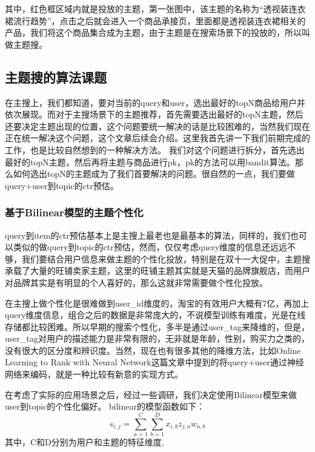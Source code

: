 其中，红色框区域内就是投放的主题，第一张图中，该主题的名称为“透视装连衣裙流行趋势”，点击之后就会进入一个商品承接页，里面都是透视装连衣裙相关的产品，我们将这个商品集合成为主题，由于主题是在搜索场景下的投放的，所以叫做主题搜。
\subsection{主题搜的算法课题}
在主搜上，我们都知道，要对当前的query和user，选出最好的topN商品给用户并依次展现。而对于主搜场景下的主题推荐，首先需要选出最好的topN主题，然后还要决定主题出现的位置，这个问题要统一解决的话是比较困难的，当然我们现在正在统一解决这个问题，这个文章后续会介绍。这里我首先讲一下我们前期完成的工作，也是比较自然想到的一种解决方法。
我们对这个问题进行拆分，首先选出最好的topN主题，然后再将主题与商品进行pk，pk的方法可以用bandit算法。那么如何选出topN的主题成为了我们首要解决的问题。很自然的一点，我们要做query+user到topic的ctr预估。
\subsubsection{基于Bilinear模型的主题个性化}
query到item的ctr预估基本上是主搜上最老也是最基本的算法，同样的，我们也可以类似的做query到topic的ctr预估，然而，仅仅考虑query维度的信息还远远不够，我们要结合用户信息来做主题的个性化投放，特别是在双十一大促中，主题搜承载了大量的旺铺卖家主题，这里的旺铺主题其实就是天猫的品牌旗舰店，而用户对品牌其实是有明显的个人喜好的，那么这就非常需要做个性化投放。
\par 在主搜上做个性化是很难做到user\_id维度的，淘宝的有效用户大概有7亿，再加上query维度信息，组合之后的数据是非常庞大的，不说模型训练有难度，光是在线存储都比较困难。所以早期的搜索个性化，多半是通过user\_tag来降维的，但是，user\_tag对用户的描述能力是非常有限的，无非就是年龄，性别，购买力之类的，没有很大的区分度和辨识度。当然，现在也有很多其他的降维方法，比如Online Learning to Rank with Neural Network这篇文章中提到的将query+user通过神经网络来编码，就是一种比较有新意的实现方式。
\par 在考虑了实际的应用场景之后，经过一些调研，我们决定使用Bilinear模型来做user到topic的个性化偏好。
bilinear的模型函数如下：
$$ s_{i,j} = \sum_{a=1}^C \sum_{b=1}^Dx_{i,b}z_{j,a}w_{a,b}  $$
其中，C和D分别为用户和主题的特征维度,

